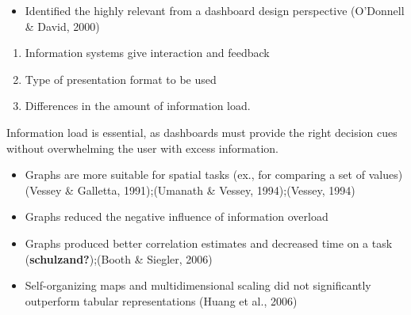 \documentclass[print]{nuthesis}
\providecommand{\tightlist}{%
  \setlength{\itemsep}{0pt}\setlength{\parskip}{0pt}}
\begin{document}

\begin{itemize}
\tightlist
\item
  Identified the highly relevant from a dashboard design perspective (O'Donnell \& David, 2000)
\end{itemize}

\begin{enumerate}
\def\labelenumi{\arabic{enumi}.}
\tightlist
\item
  Information systems give interaction and feedback
\item
  Type of presentation format to be used
\item
  Differences in the amount of information load.
\end{enumerate}

Information load is essential, as dashboards must provide the right decision cues without overwhelming the user with excess information.



\begin{itemize}
\tightlist
\item
  Graphs are more suitable for spatial tasks (ex., for comparing a set of values) (Vessey \& Galletta, 1991);(Umanath \& Vessey, 1994);(Vessey, 1994)
\item
  Graphs reduced the negative influence of information overload
\item
  Graphs produced better correlation estimates and decreased time on a task (\textbf{schulzand?});(Booth \& Siegler, 2006)
\item
  Self-organizing maps and multidimensional scaling did not significantly outperform tabular representations (Huang et al., 2006)
\end{itemize}
\end{document}
